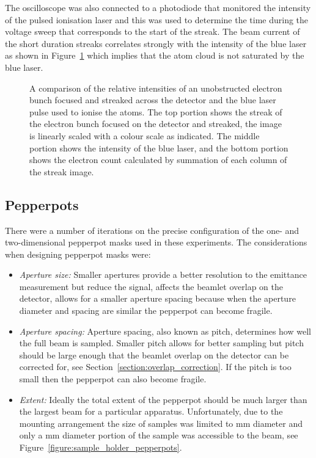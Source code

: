 The oscilloscope was also connected to a photodiode that monitored the intensity of the pulsed ionisation laser and this was used to determine the time during the voltage sweep that corresponds to the start of the streak.
The beam current of the short duration streaks correlates strongly with the intensity of the blue laser as shown in Figure~\ref{figure:blue_streak} which implies that the atom cloud is not saturated by the blue laser.

\begin{figure}
    \center
    
    \caption[Comparison between time-resolved electron count and ionisation laser power.]{A comparison of the relative intensities of an unobstructed electron bunch focused and streaked across the detector and the blue laser pulse used to ionise the atoms.
    The top portion shows the streak of the electron bunch focused on the detector and streaked, the image is linearly scaled with a colour scale as indicated. The middle portion shows the intensity of the blue laser, and the bottom portion shows the electron count calculated by summation of each column of the streak image.}
    \label{figure:blue_streak}
\end{figure}

\subsection{Pepperpots}
There were a number of iterations on the precise configuration of the one- and two-dimensional pepperpot masks used in these experiments.
The considerations when designing pepperpot masks were:
\begin{itemize}
    \item{\emph{Aperture size:} Smaller apertures provide a better resolution to the emittance measurement but reduce the signal, affects the beamlet overlap on the detector, allows for a smaller aperture spacing because when the aperture diameter and spacing are similar the pepperpot can become fragile.}
    \item{\emph{Aperture spacing:} Aperture spacing, also known as pitch, determines how well the full beam is sampled.
    Smaller pitch allows for better sampling but pitch should be large enough that the beamlet overlap on the detector can be corrected for, see Section~\ref{section:overlap_correction}.
    If the pitch is too small then the pepperpot can also become fragile.}
    \item{\emph{Extent:} Ideally the total extent of the pepperpot should be much larger than the largest beam for a particular apparatus.
    Unfortunately, due to the mounting arrangement the size of samples was limited to \unit[3]{mm} diameter and only a \unit[2]{mm} diameter portion of the sample was accessible to the beam, see Figure~\ref{figure:sample_holder_pepperpots}.}
\end{itemize}

